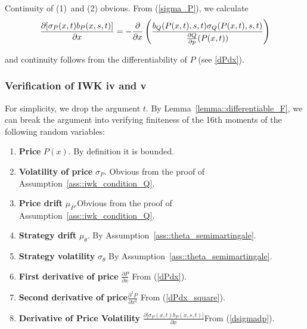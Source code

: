\documentclass{article}
\begin{document}
Continuity of (1)\ and (2) obvious. From (\ref{sigma_P}), we calculate
\begin{equation}
\frac{\partial \lbrack \sigma _{P}(x,t)b_{P}(x,s,t)]}{\partial x}=-\frac{%
\partial }{\partial x}\left( \frac{b_{Q}(P(x,t),s,t)\sigma _{Q}(P(x,t),s,t)}{%
\frac{\partial Q}{\partial p}(P(x,t))}\right)   \label{dsigmadp}
\end{equation}

and continuity follows from the differentiability of $P$ (see \ref{dPdx}).

\subsubsection{Verification of IWK iv and v}

For simplicity, we drop the argument $t$. By Lemma~\ref{lemma::differentiable_F}, we can break the
argument into verifying finiteness of the 16th moments of the following
random variables:

\bigskip

\begin{enumerate}
\item \textbf{Price }$P(x).$ By definition it is bounded.

\item \textbf{Volatility of price }$\sigma _{P}$. Obvious from the proof of
Assumption~\ref{ass::iwk_condition_Q}.

\item \textbf{Price drift }$\mu _{P}.$Obvious from the proof of Assumption~\ref{ass::iwk_condition_Q}.

\item \textbf{Strategy drift }$\mu _{\theta }.$ By Assumption~\ref{ass::theta_semimartingale}.

\item \textbf{Strategy volatility }$\sigma _{\theta }$ By Assumption~\ref{ass::theta_semimartingale}.

\item \textbf{First derivative of price} $\frac{\partial P}{\partial x}$
From (\ref{dPdx}).

\item \textbf{Second derivative of price}$\frac{\partial ^{2}P}{\partial
x^{2}}$ From (\ref{dPdx_square}).

\item \textbf{Derivative of Price Volatility }$\frac{\partial \lbrack \sigma
_{P}(x,t)b_{P}(x,s,t)]}{\partial x}$From (\ref{dsigmadp}).
\end{enumerate}
\end{document}
